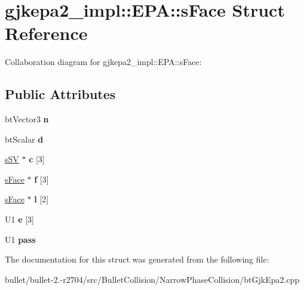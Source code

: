 \hypertarget{structgjkepa2__impl_1_1_e_p_a_1_1s_face}{\section{gjkepa2\+\_\+impl\+:\+:E\+P\+A\+:\+:s\+Face Struct Reference}
\label{structgjkepa2__impl_1_1_e_p_a_1_1s_face}
}


Collaboration diagram for gjkepa2\+\_\+impl\+:\+:E\+P\+A\+:\+:s\+Face\+:
\subsection*{Public Attributes}
\begin{DoxyCompactItemize}
\item 
\hypertarget{structgjkepa2__impl_1_1_e_p_a_1_1s_face_a7242f9c39910b760329d56a846cb2084}{bt\+Vector3 {\bfseries n}}\label{structgjkepa2__impl_1_1_e_p_a_1_1s_face_a7242f9c39910b760329d56a846cb2084}

\item 
\hypertarget{structgjkepa2__impl_1_1_e_p_a_1_1s_face_a5aa2572578985a659d54766dd230f0b6}{bt\+Scalar {\bfseries d}}\label{structgjkepa2__impl_1_1_e_p_a_1_1s_face_a5aa2572578985a659d54766dd230f0b6}

\item 
\hypertarget{structgjkepa2__impl_1_1_e_p_a_1_1s_face_abde121ff9ab6e987af62d201f4e11b4b}{\hyperlink{structgjkepa2__impl_1_1_g_j_k_1_1s_s_v}{s\+S\+V} $\ast$ {\bfseries c} \mbox{[}3\mbox{]}}\label{structgjkepa2__impl_1_1_e_p_a_1_1s_face_abde121ff9ab6e987af62d201f4e11b4b}

\item 
\hypertarget{structgjkepa2__impl_1_1_e_p_a_1_1s_face_a8e66ed87024afa716eea0cb6aaf75c96}{\hyperlink{structgjkepa2__impl_1_1_e_p_a_1_1s_face}{s\+Face} $\ast$ {\bfseries f} \mbox{[}3\mbox{]}}\label{structgjkepa2__impl_1_1_e_p_a_1_1s_face_a8e66ed87024afa716eea0cb6aaf75c96}

\item 
\hypertarget{structgjkepa2__impl_1_1_e_p_a_1_1s_face_abba40edc9397fe52ba4ea37c85e166e3}{\hyperlink{structgjkepa2__impl_1_1_e_p_a_1_1s_face}{s\+Face} $\ast$ {\bfseries l} \mbox{[}2\mbox{]}}\label{structgjkepa2__impl_1_1_e_p_a_1_1s_face_abba40edc9397fe52ba4ea37c85e166e3}

\item 
\hypertarget{structgjkepa2__impl_1_1_e_p_a_1_1s_face_a81d623f8eca043ad973a9cdd6f791e8a}{U1 {\bfseries e} \mbox{[}3\mbox{]}}\label{structgjkepa2__impl_1_1_e_p_a_1_1s_face_a81d623f8eca043ad973a9cdd6f791e8a}

\item 
\hypertarget{structgjkepa2__impl_1_1_e_p_a_1_1s_face_a6a0ef1327923a6ac1b8b9a88c36234f8}{U1 {\bfseries pass}}\label{structgjkepa2__impl_1_1_e_p_a_1_1s_face_a6a0ef1327923a6ac1b8b9a88c36234f8}

\end{DoxyCompactItemize}


The documentation for this struct was generated from the following file\+:\begin{DoxyCompactItemize}
\item 
bullet/bullet-\/2.-\/r2704/src/\+Bullet\+Collision/\+Narrow\+Phase\+Collision/bt\+Gjk\+Epa2.\+cpp\end{DoxyCompactItemize}
